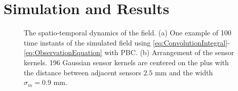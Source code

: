 \documentclass[10pt,twocolumn,twoside]{IEEEtran}
\begin{document}
\section{Simulation and Results}   
\begin{figure}[ht]
	\centering
	\caption{The spatio-temporal dynamics of the field. (a) One example of 100 time instants of the simulated field using \eqref{eq:ConvolutionIntegral}-\eqref{eq:ObservationEquation}   with PBC. (b) Arrangement of the sensor kernels. 196 Gaussian sensor kernels are centered on the plus with the distance between adjacent sensors $2.5$ mm and the width $\sigma_m=0.9$ mm.}
	\label{fig:SimulatedData}
\end{figure}
\end{document}
